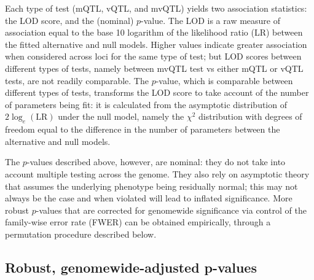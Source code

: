 \documentclass[9pt,twocolumn,twoside]{gsag3jnl}
\begin{document}
Each type of test (mQTL, vQTL, and mvQTL) yields two association statistics: the LOD score, and the (nominal) $p$-value.
The LOD is a raw measure of association equal to the base 10 logarithm of the likelihood ratio (LR) between the fitted alternative and null models.
Higher values indicate greater association when considered across loci for the same type of test; but LOD scores between different types of tests, namely between mvQTL test vs either mQTL or vQTL tests, are not readily comparable.
The $p$-value, which is comparable between different types of tests, transforms the LOD score to take account of the number of parameters being fit: it is calculated from the asymptotic distribution of $2\log_e\left(\text{LR}\right)$ under the null model, namely the $\chi^2$ distribution with degrees of freedom equal to the difference in the number of parameters between the alternative and null models.

The $p$-values described above, however, are nominal: they do not take into account multiple testing across the genome.
    They also rely on asymptotic theory that assumes the underlying phenotype being residually normal; this may not always be the case and when violated will lead to inflated significance.
More robust $p$-values that are corrected for genomewide significance via control of the family-wise error rate (FWER) can be obtained empirically, through a permutation procedure described below.

\subsection{Robust, genomewide-adjusted p-values}
\end{document}
